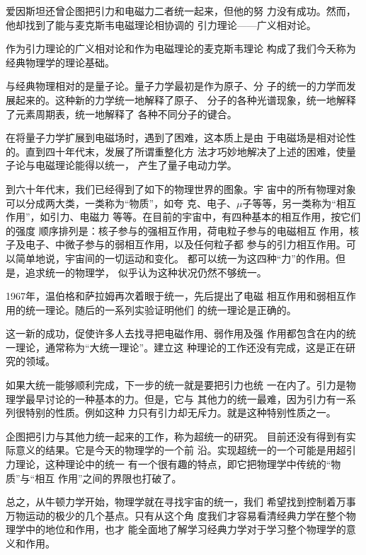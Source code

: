 爱因斯坦还曾企图把引力和电磁力二者统一起来，但他的努
力没有成功。然而，他却找到了能与麦克斯韦电磁理论相协调的
引力理论——广义相对论。

作为引力理论的广义相对论和作为电磁理论的麦克斯韦理论
构成了我们今夭称为经典物理学的理论基础。

与经典物理相对的是量子论。量子力学最初是作为原子、分
子的统一的力学而发展起来的。这种新的力学统一地解释了原子、
分子的各种光谱现象，统一地解释了元素周期表，统一地解释了
各种不同分子的键合。

在将量子力学扩展到电磁场时，遇到了困难，这本质上是由
于电磁场是相对论性的。直到四十年代末，发展了所谓重整化方
法才巧妙地解决了上述的困难，使量子论与电磁理论能得以统一，
产生了量子电动力学。

到六十年代末，我们已经得到了如下的物理世界的图象。宇
宙中的所有物理对象可以分成两大类，一类称为“物质”，如夸
克、电子、$\mu$子等等，另一类称为“相互作用”，如引力、电磁力
等等。在目前的宇宙中，有四种基本的相互作用，按它们的强度
顺序排列是：核子参与的强相互作用，荷电粒子参与的电磁相互
作用，核子及电子、中微子参与的弱相互作用，以及任何粒子都
参与的引力相互作用。可以简单地说，宇宙间的一切运动和变化。
都可以统一为这四种“力”的作用。但是，追求统一的物理学，
似乎认为这种状况仍然不够统一。

1967年，温伯格和萨拉姆再次着眼于统一，先后提出了电磁
相互作用和弱相互作用的统一理论。随后的一系列实验证明他们
的统一理论是正确的。

这一新的成功，促使许多人去找寻把电磁作用、弱作用及强
作用都包含在内的统一理论，通常称为“大统一理论”。建立这
种理论的工作还没有完成，这是正在研究的领域。

如果大统一能够顺利完成，下一步的统一就是要把引力也统
一在内了。引力是物理学最早讨论的一种基本的力。但是，它与
其他力的统一最难，因为引力有一系列很特别的性质。例如这种
力只有引力却无斥力。就是这种特别性质之一。

企图把引力与其他力统一起来的工作，称为超统一的研究。
目前还没有得到有实际意义的结果。它是今天的物理学的一个前
沿。实现超统一的一个可能是用超引力理论，这种理论中的统一
有一个很有趣的特点，即它把物理学中传统的“物质”与“相互
作用”之间的界限也打破了。

总之，从牛顿力学开始，物理学就在寻找宇宙的统一，我们
希望找到控制着万事万物运动的极少的几个基点。只有从这个角
度我们才容易看清经典力学在整个物理学中的地位和作用，也才
能全面地了解学习经典力学对于学习整个物理学的意义和作用。

